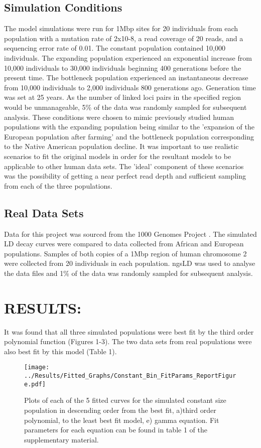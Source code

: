 \documentclass[11pt]{article}
\begin{document}
\begin{linenumbers}
\subsection{Simulation Conditions}
The model simulations were run for 1Mbp sites for 20 individuals from each population with a mutation rate of 2x10-8, a read coverage of 20 reads, and a sequencing error rate of 0.01. The constant population contained 10,000 individuals. The expanding population experienced an exponential increase from 10,000 individuals to 30,000 individuals beginning 400 generations before the present time. The bottleneck population experienced an instantaneous decrease from 10,000 individuals to 2,000 individuals 800 generations ago. Generation time was set at 25 years. As the number of linked loci pairs in the specified region would be unmanageable, 5\% of the data was randomly sampled for subsequent analysis. These conditions were chosen to mimic previously studied human populations with the expanding population being similar to the 'expansion of the European population after farming' and the bottleneck population corresponding to the Native American population decline. It was important to use realistic scenarios to fit the original models in order for the resultant models to be applicable to other human data sets. The 'ideal' component of these scenarios was the possibility of getting a near perfect read depth and sufficient sampling from each of the three populations.

\subsection{Real Data Sets}
Data for this project was sourced from the 1000 Genomes Project \citep{10002015global}. The simulated LD decay curves were compared to data collected from African and European populations. Samples of both copies of a 1Mbp region of human chromosome 2 were collected from 20 individuals in each population. ngsLD {} was used to analyse the data files and 1\% of the data was randomly sampled for subsequent analysis.     

\section{RESULTS:}
It was found that all three simulated populations were best fit by the third order polynomial function (Figures 1-3). The two data sets from real populations were also best fit by this model (Table 1).   

\begin{figure}[htp]
\begin{center}
\texttt{[image: ../Results/Fitted\_Graphs/Constant\_Bin\_FitParams\_ReportFigure.pdf]}
\caption{\small Plots of each of the 5 fitted curves for the simulated constant size population in descending order from the best fit, a)third order polynomial, to the least best fit model, e) gamma equation. Fit parameters for each equation can be found in table 1 of the supplementary material.}
\end{center}
\end{figure}


\end{linenumbers}
\end{document}

